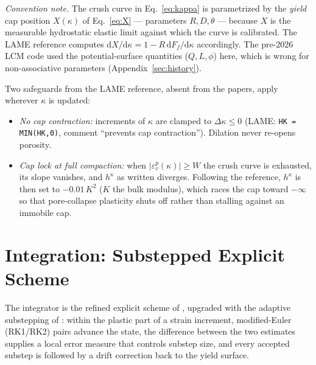 \documentclass[12pt]{article}
\begin{document}
\emph{Convention note.} The crush curve in Eq.~\eqref{eq:kappa} is
parametrized by the \emph{yield} cap position $X(\kappa)$ of
Eq.~\eqref{eq:X} --- parameters $R, D, \theta$ --- because $X$ is the
measurable hydrostatic elastic limit against which the curve is
calibrated. The LAME reference computes
$\mathrm{d}X/\mathrm{d}\kappa = 1 - R\,\mathrm{d}F_f/\mathrm{d}\kappa$
accordingly. The pre-2026 LCM code used the potential-surface
quantities ($Q, L, \phi$) here, which is wrong for non-associative
parameters (Appendix~\ref{sec:history}).

Two safeguards from the LAME reference, absent from the papers,
apply wherever $\kappa$ is updated:
\begin{itemize}
\item \emph{No cap contraction:} increments of $\kappa$ are clamped
      to $\Delta\kappa \le 0$ (LAME:
      \texttt{HK = MIN(HK,0)}, comment ``prevents cap
      contraction''). Dilation never re-opens porosity.
\item \emph{Cap lock at full compaction:} when
      $|\varepsilon_v^p(\kappa)| \ge W$ the crush curve is exhausted,
      its slope vanishes, and $h^\kappa$ as written diverges.
      Following the reference, $h^\kappa$ is then set to
      $-0.01\,K^2$ ($K$ the bulk modulus), which races the cap toward
      $-\infty$ so that pore-collapse plasticity shuts off rather
      than stalling against an immobile cap.
\end{itemize}

\section{Integration: Substepped Explicit Scheme}
\label{sec:integration}

The integrator is the refined explicit scheme of
\citet[Algorithms~1--2]{Sun.Chen.Ostien:2014}, upgraded with the
adaptive substepping of \citet{Sloan.Abbo.Sheng:2001}: within the
plastic part of a strain increment, modified-Euler (RK1/RK2) pairs
advance the state, the difference between the two estimates supplies
a local error measure that controls substep size, and every accepted
substep is followed by a drift correction back to the yield surface.
\end{document}

